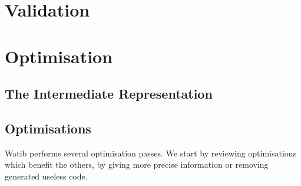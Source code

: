 \documentclass[10pt]{article}
\begin{document}
\section{Validation}\label{val}
\section{Optimisation}\label{opt}
\subsection{The Intermediate Representation}\label{ir}
\subsection{Optimisations}
Watib performs several optimisation passes. We start by reviewing optimisations
which benefit the others, by giving more precise information or removing
generated useless code.
\end{document}

